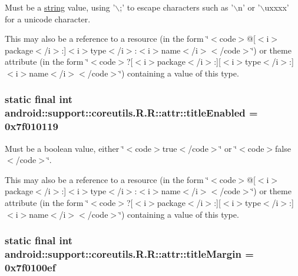 Must be a \hyperlink{classandroid_1_1support_1_1coreutils_1_1_r_1_1string}{string} value, using '$\backslash$;' to escape characters such as '$\backslash$n' or '$\backslash$uxxxx' for a unicode character. 

This may also be a reference to a resource (in the form \char`\"{}$<$code$>$@\mbox{[}$<$i$>$package$<$/i$>$:\mbox{]}$<$i$>$type$<$/i$>$:$<$i$>$name$<$/i$>$$<$/code$>$\char`\"{}) or theme attribute (in the form \char`\"{}$<$code$>$?\mbox{[}$<$i$>$package$<$/i$>$:\mbox{]}\mbox{[}$<$i$>$type$<$/i$>$:\mbox{]}$<$i$>$name$<$/i$>$$<$/code$>$\char`\"{}) containing a value of this type. \hypertarget{classandroid_1_1support_1_1coreutils_1_1_r_1_1attr_a69ec4cd4fffca76c99485dcd70ed203}{
\subsubsection[{titleEnabled}]{\setlength{\rightskip}{0pt plus 5cm}static final int android::support::coreutils.R.R::attr::titleEnabled = 0x7f010119}}
\label{classandroid_1_1support_1_1coreutils_1_1_r_1_1attr_a69ec4cd4fffca76c99485dcd70ed203}


Must be a boolean value, either \char`\"{}$<$code$>$true$<$/code$>$\char`\"{} or \char`\"{}$<$code$>$false$<$/code$>$\char`\"{}. 

This may also be a reference to a resource (in the form \char`\"{}$<$code$>$@\mbox{[}$<$i$>$package$<$/i$>$:\mbox{]}$<$i$>$type$<$/i$>$:$<$i$>$name$<$/i$>$$<$/code$>$\char`\"{}) or theme attribute (in the form \char`\"{}$<$code$>$?\mbox{[}$<$i$>$package$<$/i$>$:\mbox{]}\mbox{[}$<$i$>$type$<$/i$>$:\mbox{]}$<$i$>$name$<$/i$>$$<$/code$>$\char`\"{}) containing a value of this type. \hypertarget{classandroid_1_1support_1_1coreutils_1_1_r_1_1attr_ba146b49064adc1f52905b9bf8cb78ae}{
\subsubsection[{titleMargin}]{\setlength{\rightskip}{0pt plus 5cm}static final int android::support::coreutils.R.R::attr::titleMargin = 0x7f0100ef}}
\label{classandroid_1_1support_1_1coreutils_1_1_r_1_1attr_ba146b49064adc1f52905b9bf8cb78ae}


